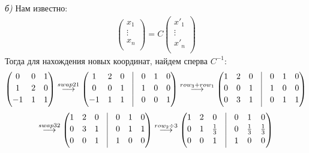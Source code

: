 \documentclass[a4paper,11pt]{article}
\begin{document}
\textsl{б)}
Нам известно:
\begin{gather*}
	\begin{pmatrix}
	x_1 \\
	\vdots \\
	x_n \\
	\end{pmatrix}
	= C 
	\begin{pmatrix}
	x'_1 \\
	\vdots \\
	x'_n \\
	\end{pmatrix}
\end{gather*}
\newpage
\noindent Тогда для нахождения новых координат, найдем сперва $ C^{-1} $:
\begin{gather*}
\begin{pmatrix}
0 & 0 & 1 \\[2pt]
1 & 2 & 0 \\[2pt]
-1 & 1 & 1 \\[2pt]
\end{pmatrix}
\stackrel{ swap 2 1 }{\longrightarrow}
\begin{pmatrix}
1 & 2 & 0 & \vrule & 0 & 1 & 0 \\[2pt]
0 & 0 & 1 & \vrule & 1 & 0 & 0 \\[2pt]
-1 & 1 & 1 & \vrule & 0 & 0 & 1 \\[2pt]
\end{pmatrix}
\stackrel{ row_{3} + row_{1} }{\longrightarrow}
\begin{pmatrix}
1 & 2 & 0 & \vrule & 0 & 1 & 0 \\[2pt]
0 & 0 & 1 & \vrule & 1 & 0 & 0 \\[2pt]
0 & 3 & 1 & \vrule & 0 & 1 & 1 \\[2pt]
\end{pmatrix}
\\[3pt]
\stackrel{ swap 3 2 }{\longrightarrow}
\begin{pmatrix}
1 & 2 & 0 & \vrule & 0 & 1 & 0 \\[2pt]
0 & 3 & 1 & \vrule & 0 & 1 & 1 \\[2pt]
0 & 0 & 1 & \vrule & 1 & 0 & 0 \\[2pt]
\end{pmatrix}
\stackrel{ row_{2} \div 3 }{\longrightarrow}
\begin{pmatrix}
1 & 2 & 0 & \vrule & 0 & 1 & 0 \\[2pt]
0 & 1 & \frac{1}{3} & \vrule & 0 & \frac{1}{3} & \frac{1}{3} \\[2pt]
0 & 0 & 1 & \vrule & 1 & 0 & 0 \\[2pt]

\end{pmatrix}
\end{gather*}
\end{document}
